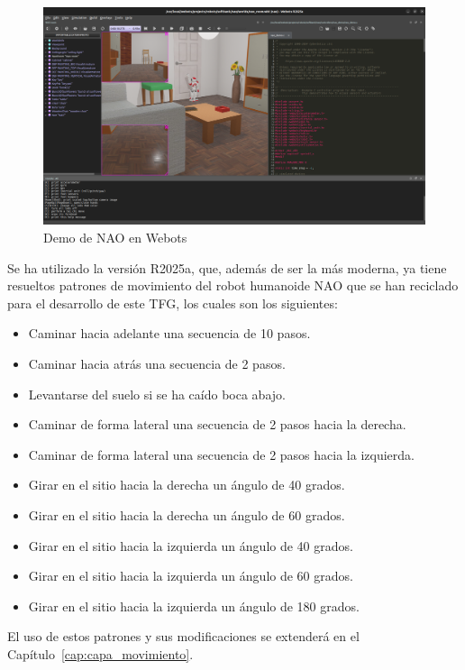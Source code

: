 \begin{figure}[H]
    \centering
    \includegraphics[width=1\textwidth]{figures/cap_3/webots.png}
    \caption{Demo de NAO en Webots}
    \label{fig:demo_webots}
\end{figure}

Se ha utilizado la versión R2025a, que, además de ser la más moderna, ya tiene resueltos patrones de movimiento del robot humanoide NAO que se han reciclado para el desarrollo de este TFG, los cuales son los siguientes:

\begin{itemize}
\item Caminar hacia adelante una secuencia de 10 pasos.
\item Caminar hacia atrás una secuencia de 2 pasos.
\item Levantarse del suelo si se ha caído boca abajo.
\item Caminar de forma lateral una secuencia de 2 pasos hacia la derecha.
\item Caminar de forma lateral una secuencia de 2 pasos hacia la izquierda.
\item Girar en el sitio hacia la derecha un ángulo de 40 grados.
\item Girar en el sitio hacia la derecha un ángulo de 60 grados.
\item Girar en el sitio hacia la izquierda un ángulo de 40 grados.
\item Girar en el sitio hacia la izquierda un ángulo de 60 grados.
\item Girar en el sitio hacia la izquierda un ángulo de 180 grados.
\end{itemize}

El uso de estos patrones y sus modificaciones se extenderá en el Capítulo~\ref{cap:capa_movimiento}.